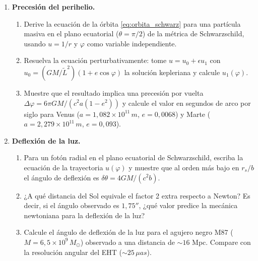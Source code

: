 \begin{enumerate}[leftmargin=2em, label=\textbf{P\thechapter.\arabic*.}]
  \item \textbf{Precesión del perihelio.}
  \begin{enumerate}[label=(\alph*)]
    \item Derive la ecuación de la órbita \eqref{eq:orbita_schwarz} para una partícula masiva en el plano ecuatorial ($\theta = \pi/2$) de la métrica de Schwarzschild, usando $u = 1/r$ y $\varphi$ como variable independiente.
    \item Resuelva la ecuación perturbativamente: tome $u = u_0 + \epsilon u_1$ con $u_0 = (GM/\tilde{L}^2)(1+e\cos\varphi)$ la solución kepleriana y calcule $u_1(\varphi)$.
    \item Muestre que el resultado implica una precesión por vuelta $\Delta\varphi = 6\pi GM/(c^2 a(1-e^2))$ y calcule el valor en segundos de arco por siglo para Venus ($a = 1{,}082\times10^{11}\,\si{m}$, $e = 0{,}0068$) y Marte ($a = 2{,}279\times10^{11}\,\si{m}$, $e = 0{,}093$).
  \end{enumerate}

  \item \textbf{Deflexión de la luz.}
  \begin{enumerate}[label=(\alph*)]
    \item Para un fotón radial en el plano ecuatorial de Schwarzschild, escriba la ecuación de la trayectoria $u(\varphi)$ y muestre que al orden más bajo en $r_s/b$ el ángulo de deflexión es $\delta\theta = 4GM/(c^2 b)$.
    \item ¿A qué distancia del Sol equivale el factor 2 extra respecto a Newton? Es decir, si el ángulo observado es $1{,}75''$, ¿qué valor predice la mecánica newtoniana para la deflexión de la luz?
    \item Calcule el ángulo de deflexión de la luz para el agujero negro M87 ($M = 6{,}5\times10^9\,M_\odot$) observado a una distancia de $\sim 16$ Mpc. Compare con la resolución angular del EHT ($\sim 25\,\si{\mu as}$).
  \end{enumerate}


\end{enumerate}
